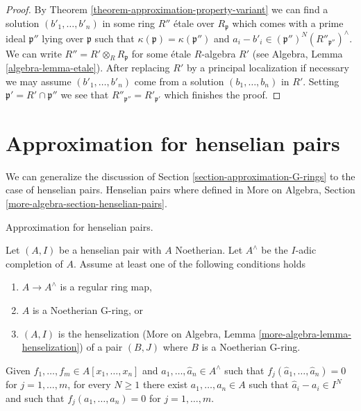 \begin{proof}
By Theorem \ref{theorem-approximation-property-variant}
we can find a solution $(b'_1, \ldots, b'_n)$ in some ring
$R''$ \'etale over $R_\mathfrak p$ which comes with a
prime ideal $\mathfrak p''$ lying over $\mathfrak p$ such
that $\kappa(\mathfrak p) = \kappa(\mathfrak p'')$ and
$a_i - b'_i \in (\mathfrak p'')^N(R''_{\mathfrak p''})^\wedge$.
We can write
$R'' = R' \otimes_R R_\mathfrak p$ for some \'etale $R$-algebra $R'$
(see Algebra, Lemma \ref{algebra-lemma-etale}). After replacing
$R'$ by a principal localization if necessary we may assume
$(b'_1, \ldots, b'_n)$ come from a solution $(b_1, \ldots, b_n)$
in $R'$. Setting $\mathfrak p' = R' \cap \mathfrak p''$ we
see that $R''_{\mathfrak p''} = R'_{\mathfrak p'}$ which finishes the proof.
\end{proof}



\section{Approximation for henselian pairs}
\label{section-approximation-pairs}

\noindent
We can generalize the discussion of
Section \ref{section-approximation-G-rings} to the case of henselian pairs.
Henselian pairs where defined in
More on Algebra, Section \ref{more-algebra-section-henselian-pairs}.

\begin{lemma}
\label{lemma-henselian-pair}
\begin{slogan}
Approximation for henselian pairs.
\end{slogan}
Let $(A, I)$ be a henselian pair with $A$ Noetherian.
Let $A^\wedge$ be the $I$-adic completion
of $A$. Assume at least one of the following
conditions holds
\begin{enumerate}
\item $A \to A^\wedge$ is a regular ring map,
\item $A$ is a Noetherian G-ring, or
\item $(A, I)$ is the henselization
(More on Algebra, Lemma \ref{more-algebra-lemma-henselization})
of a pair $(B, J)$ where $B$ is a Noetherian G-ring.
\end{enumerate}
Given $f_1, \ldots, f_m \in A[x_1, \ldots, x_n]$
and $\hat{a}_1, \ldots, \hat{a}_n \in A^\wedge$ such that
$f_j(\hat{a}_1, \ldots, \hat{a}_n) = 0$
for $j = 1, \ldots, m$, for every $N \geq 1$ there exist
$a_1, \ldots, a_n \in A$ such that
$\hat{a}_i - a_i \in I^N$ and such that $f_j(a_1, \ldots, a_n) = 0$
for $j = 1, \ldots, m$.
\end{lemma}

